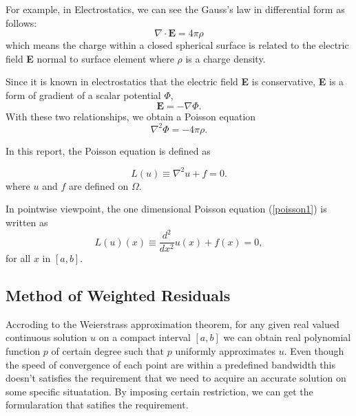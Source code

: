 For example, in Electrostatics, we can see the Gauss's law in differential form as follows\cite{Johnson}:
\begin{equation}
\nabla \cdot \mathbf{E} = 4 \pi \rho
\end{equation}
which means the charge within a closed spherical surface is related to the electric field \textbf{E} normal to surface element where $\rho$ is a charge density.

Since it is known in electrostatics that the electric field \textbf{E} is conservative, \textbf{E} is a form of gradient of a scalar potential $\Phi$,
\begin{equation}
\mathbf{E} = - \nabla\Phi.
\end{equation}
With these two relationships, we obtain a Poisson equation
\begin{equation}
\nabla^2\Phi = -4\pi\rho.
\end{equation}

In this report, the Poisson equation is defined as

\begin{equation}
\label{poisson1}
L(u) \equiv  \nabla^2 u + f = 0.
\end{equation}
where $u$ and $f$ are defined on $\Omega$.

In pointwise viewpoint, the one dimensional Poisson equation
(\ref{poisson1}) is written as
\begin{equation}
\label{poisson2}
L(u)(x) \equiv \frac{d^2}{dx^2} u(x) + f(x) = 0,
\end{equation}
for all $x$ in $[a, b]$.

\subsection{Method of Weighted Residuals}
Accroding to the Weierstrass approximation theorem, for any given real valued continuous solution $u$ on a compact interval $[a, b]$ we can obtain real polynomial function $p$ of certain degree such that $p$ uniformly approximates $u$. Even though the speed of convergence of each point are within a predefined bandwidth this doesn't satisfies the requirement that we need to acquire an accurate solution on some specific situatation. By imposing certain restriction, we can get the formularation that satifies the requirement.

